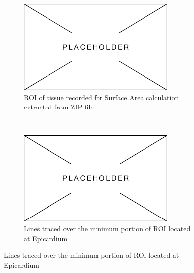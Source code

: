 \begin{figure}[H]
    \centering
    
    \begin{subfigure}[t]{0.475\textwidth}
    \centering
    \includegraphics[width=1\linewidth]{Figures/Placeholder.png}
    \caption{ROI of tissue recorded for Surface Area calculation extracted from ZIP file}
    \end{subfigure}
    ~
    \begin{subfigure}[t]{0.475\textwidth}
    \centering
    \includegraphics[width=1\linewidth]{Figures/Placeholder.png}
    \caption{Lines traced over the minimum portion of ROI located at Epicardium}
    \end{subfigure}
    \medskip


\end{figure}
